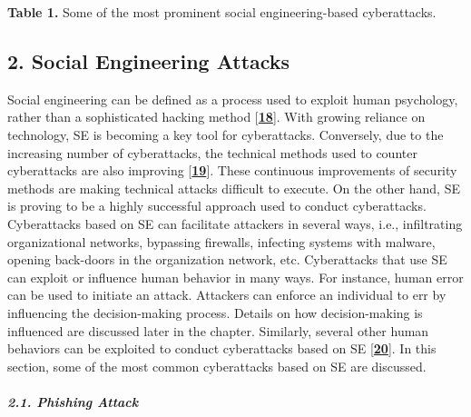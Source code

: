  \textbf{Table 1.} Some of the most prominent social engineering-based cyberattacks.


\subsection{\textbf{2. Social Engineering Attacks}}

Social engineering can be defined as a process used to exploit human psychology, rather than a sophisticated hacking method [\href{https://www.mdpi.com/2076-3417/12/12/6042\#B18-applsci-12-06042}{\textbf{18}}]. With growing reliance on technology, SE is becoming a key tool for cyberattacks. Conversely, due to the increasing number of cyberattacks, the technical methods used to counter cyberattacks are also improving [\href{https://www.mdpi.com/2076-3417/12/12/6042\#B19-applsci-12-06042}{\textbf{19}}]. These continuous improvements of security methods are making technical attacks difficult to execute. On the other hand, SE is proving to be a highly successful approach used to conduct cyberattacks. Cyberattacks based on SE can facilitate attackers in several ways, i.e., infiltrating organizational networks, bypassing firewalls, infecting systems with malware, opening back-doors in the organization network, etc. Cyberattacks that use SE can exploit or influence human behavior in many ways. For instance, human error can be used to initiate an attack. Attackers can enforce an individual to err by influencing the decision-making process. Details on how decision-making is influenced are discussed later in the chapter. Similarly, several other human behaviors can be exploited to conduct cyberattacks based on SE [\href{https://www.mdpi.com/2076-3417/12/12/6042\#B20-applsci-12-06042}{\textbf{20}}]. In this section, some of the most common cyberattacks based on SE are discussed.

\paragraph{\textit{2.1. Phishing Attack}}

